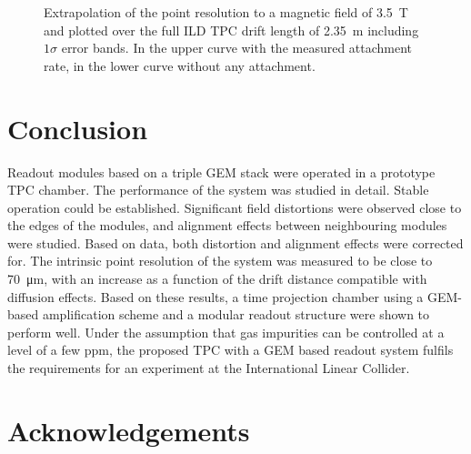 \documentclass[preprint]{elsarticle}
\begin{document}
%
%


\begin{figure}[tb]
\centering
\iftoggle{blackandwhite}{\texttt{[image: figures/xyResolutionExtrapolatedBW.pdf]}}{\texttt{[image: figures/xyResolutionExtrapolated.pdf]}}
\caption{\small Extrapolation of the point resolution to a magnetic field of \SI{3.5}{\tesla} and plotted over the full ILD TPC drift length of \SI{2.35}{\m} including $1\sigma$ error bands. In the upper curve with the measured attachment rate, in the lower curve without any attachment.}
\label{fig:resextrapol}
\end{figure}



\section{Conclusion}
Readout modules based on a triple GEM stack were operated in a prototype TPC chamber. The performance of the system was studied in detail. 
Stable operation could be established. Significant field distortions were observed close to the edges of the modules, and alignment effects between neighbouring modules were studied. Based on data, both distortion and alignment effects were corrected for. The intrinsic point resolution of the system was measured to be close to \SI{70}{\um}, with an increase as a function of the drift distance compatible with diffusion effects. Based on these results, a time projection chamber using a GEM-based amplification scheme and a modular readout structure were shown to perform well. Under the assumption that gas impurities can be controlled at a level of a few ppm, the proposed TPC with a GEM based readout system fulfils the requirements for an experiment at the International Linear Collider.




\section{Acknowledgements} 
\end{document}
